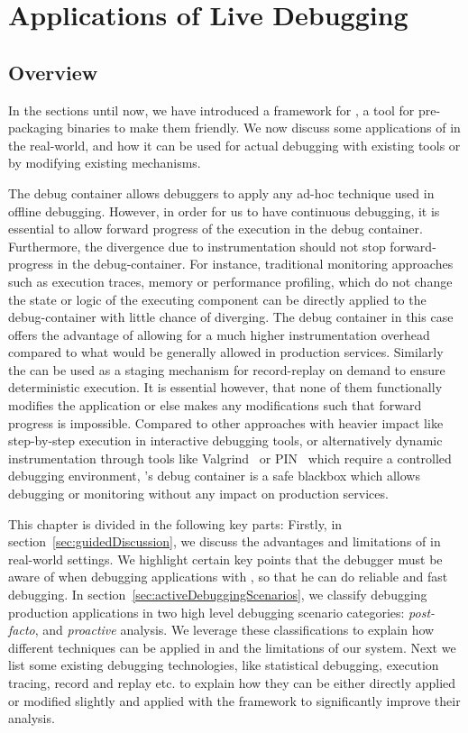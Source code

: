 \chapter{Applications of Live Debugging}
\label{ch:activedebugging}

\section{Overview}
\label{sec:guided_overview}

In the sections until now, we have introduced a framework for \livedebugging, a tool for pre-packaging binaries to make them \livedebugging friendly. 
We now discuss some applications of \livedebugging in the real-world, and how it can be used for actual debugging with existing tools or by modifying existing mechanisms.

The debug container allows debuggers to apply any ad-hoc technique used in offline debugging.
However, in order for us to have continuous debugging, it is essential to allow forward progress of the execution in the debug container. 
Furthermore, the divergence due to instrumentation should not stop forward-progress in the debug-container.
For instance, traditional monitoring approaches such as execution traces, memory or performance profiling,  which do not change the state or logic of the executing component can be directly applied to the debug-container with little chance of \debugcontainer diverging. 
The debug container in this case offers the advantage of allowing for a much higher instrumentation overhead compared to what would be generally allowed in production services.
Similarly the \debugcontainer can be used as a staging mechanism for record-replay on demand to ensure deterministic execution.
It is essential however, that none of them functionally modifies the application or else makes any modifications such that forward progress is impossible.
Compared to other approaches with heavier impact like step-by-step execution in interactive debugging tools, or alternatively dynamic instrumentation through tools like Valgrind~\cite{valgrind} or PIN~\cite{pin} which require a controlled debugging environment, \parikshan's debug container is a safe blackbox which allows debugging or monitoring without any impact on production services.

This chapter is divided in the following key parts: Firstly, in section~\ref{sec:guidedDiscussion}, we discuss the advantages and limitations of \parikshan in real-world settings.
We highlight certain key points that the debugger must be aware of when debugging applications with \parikshan, so that he can do reliable and fast debugging. 
In section~\ref{sec:activeDebuggingScenarios}, we classify debugging production applications in two high level debugging scenario categories: \emph{post-facto}, and \emph{proactive} analysis.
We leverage these classifications to explain how different techniques can be applied in \parikshan and the limitations of our system.
Next we list some existing debugging technologies, like statistical debugging, execution tracing, record and replay etc. to explain how they can be either directly applied or modified slightly and applied with the \parikshan framework to significantly improve their analysis.

